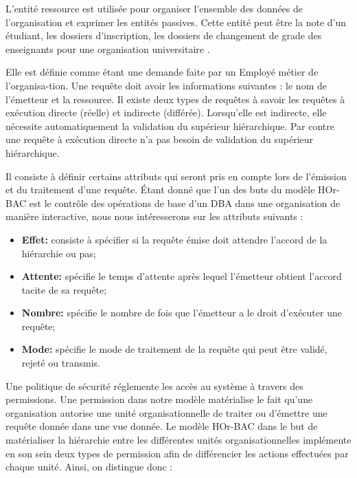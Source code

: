 \label{sectionComposantHOr-BACR}

L'entité ressource est utilisée pour organiser l'ensemble des données de l'organisation et exprimer les entités passives. Cette entité peut être la note d'un étudiant, les dossiers d'inscription, les dossiers de changement de grade des enseignants pour une organisation universitaire \cite{theseBenoit}.

\label{sectionComposantHOr-BACRe}
Elle est définie comme étant une demande faite par un Employé métier de l'organisa-tion. Une requête doit avoir les informations suivantes : le nom de l'émetteur et la ressource. Il existe deux types de requêtes à savoir les requêtes à exécution directe (réelle) et indirecte (différée). Lorsqu'elle est indirecte, elle nécessite automatiquement la validation du supérieur hiérarchique. Par contre une requête à exécution directe n'a pas besoin de validation du supérieur hiérarchique.


\label{sectionModeTraitementBOr-BAC}

Il consiste à définir certains attributs qui seront pris en compte lors de l'émission et du traitement d'une requête. Étant donné que l'un des buts du modèle HOr-BAC est le contrôle des opérations de base d'un DBA dans une organisation de manière interactive, nous nous intéresserons sur les attributs suivants : 
\begin{itemize}
\item \textbf{Effet:} consiste à spécifier si la requête émise doit attendre l'accord de la hiérarchie ou pas;
\item \textbf{Attente:} spécifie le temps d'attente après lequel l'émetteur obtient l'accord tacite de sa requête;
\item \textbf{Nombre:} spécifie le nombre de fois que l'émetteur a le droit d'exécuter une requête;
\item \textbf{Mode:} spécifie le mode de traitement de la requête qui peut être validé, rejeté ou transmis.
\end{itemize}

\label{sectionPolitiqueBOr-BAC}

Une politique de sécurité réglemente les accès au système à travers des permissions. Une permission dans notre modèle matérialise le fait qu'une organisation autorise une unité organisationnelle de traiter ou d'émettre une requête donnée dans une vue donnée. Le modèle HOr-BAC  dans le but de matérialiser la hiérarchie entre les différentes unités organisationnelles implémente en son sein deux types de permission afin de différencier les actions effectuées par chaque unité. Ainsi, on distingue donc :

